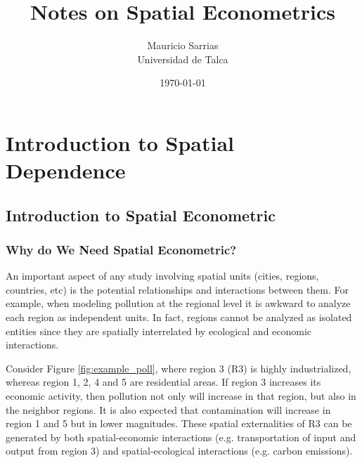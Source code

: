 \documentclass[english,12pt]{book}\usepackage[]{graphicx}\usepackage[]{xcolor}
\begin{document}
\frontmatter
\title{Notes on Spatial Econometrics}
\author{Mauricio Sarrias\\
Universidad de Talca}
\date{\today}
\maketitle
\tableofcontents

\listoffigures
\listoftables



\mainmatter

\part{Introduction to Spatial Dependence}


\chapter{Introduction to Spatial Econometric}\label{chapater:Introduction}


\section{Why do We Need Spatial Econometric?}\label{sec:why_se}

An important aspect of any study involving spatial units (cities, regions, countries, etc) is the potential relationships and interactions between them. For example, when modeling pollution at the regional level it is awkward to analyze each region as independent units.  In fact, regions cannot be analyzed as isolated entities since they are spatially interrelated by ecological and economic interactions. 

Consider Figure \ref{fig:example_poll}, where region 3 (R3) is highly industrialized, whereas region 1, 2, 4 and 5 are residential areas. If region 3 increases its economic activity, then pollution not only will increase in that region, but also in the neighbor regions. It is also expected that contamination will increase in region 1 and 5 but in lower magnitudes. These spatial externalities of R3 can be generated by both spatial-economic interactions (e.g. transportation of input and output from region 3) and spatial-ecological interactions (e.g. carbon emissions). 
\end{document}
